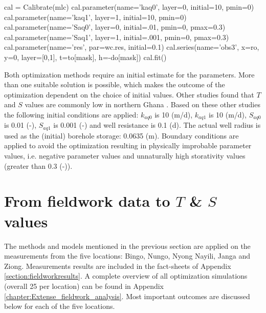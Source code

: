 \begin{python}[h!]
cal = Calibrate(mlc)
cal.parameter(name='kaq0', layer=0, initial=10, pmin=0)
cal.parameter(name='kaq1', layer=1, initial=10, pmin=0)
cal.parameter(name='Saq0', layer=0, initial=.01, pmin=0, pmax=0.3)
cal.parameter(name='Saq1', layer=1, initial=.001, pmin=0, pmax=0.3)
cal.parameter(name='res', par=wc.res, initial=0.1)
cal.series(name='obs3', x=ro, y=0, layer=[0,1], t=to[mask], h=-do[mask])
cal.fit()
\end{python}

Both optimization methods require an initial estimate for the parameters. More than one suitable solution is possible, which makes the outcome of the optimization dependent on the choice of initial values. Other studies found that $T$ and $S$ values are commonly low in northern Ghana \citep[e.g.][]{Owusu2015,Owusu2017}. Based on these other studies the following initial conditions are applied: $k_{aq0}$ is 10 (m/d), $k_{aq1}$ is 10 (m/d), $S_{aq0}$ is 0.01 (-), $S_{aq1}$ is 0.001 (-) and well resistance is 0.1 (d). The actual well radius is used as the (initial) borehole storage: 0.0635 (m). Boundary conditions are applied to avoid the optimization resulting in physically improbable parameter values, i.e. negative parameter values and unnaturally high storativity values (greater than 0.3 (-)).


\section{From fieldwork data to $T$ \& $S$ values}
\label{section:TS}
The methods and models mentioned in the previous section are applied on the measurements from the five locations: Bingo, Nungo, Nyong Nayili, Janga and Ziong. Measurements results are included in the fact-sheets of Appendix \ref{section:fieldworkresults}. A complete overview of all optimization simulations (overall 25 per location) can be found in Appendix \ref{chapter:Extense_fieldwork_analysis}. Most important outcomes are discussed below for each of the five locations.

